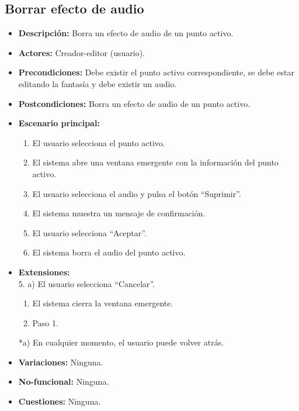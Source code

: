 \subsection{Borrar efecto de audio}
\begin{itemize}
	\item \textbf{Descripción:} Borra un efecto de audio de un punto activo.
	\item \textbf{Actores:} Creador-editor (usuario).
	\item \textbf{Precondiciones:} Debe existir el punto activo correspondiente, se debe estar editando la fantasía y debe existir un audio.
	\item \textbf{Postcondiciones:} Borra un efecto de audio de un punto activo.
	\item \textbf{Escenario principal:}
	\begin{enumerate}
		\item El usuario selecciona el punto activo.
		\item El sistema abre una ventana emergente con la información del punto activo.
		\item El usuario selecciona el audio y pulsa el botón ``Suprimir''.
		\item El sistema muestra un mensaje de confirmación.
		\item El usuario selecciona ``Aceptar''.
		\item El sistema borra el audio del punto activo.
	\end{enumerate}
	\item \textbf{Extensiones:} \\ 5. a) El usuario selecciona ``Cancelar''.
	\begin{enumerate}
		\item El sistema cierra la ventana emergente.
		\item Paso 1.
	\end{enumerate}
	*a) En cualquier momento, el usuario puede volver atrás.
	\item \textbf{Variaciones:} Ninguna.
	\item \textbf{No-funcional:} Ninguna.
	\item \textbf{Cuestiones:} Ninguna.
\end{itemize}


